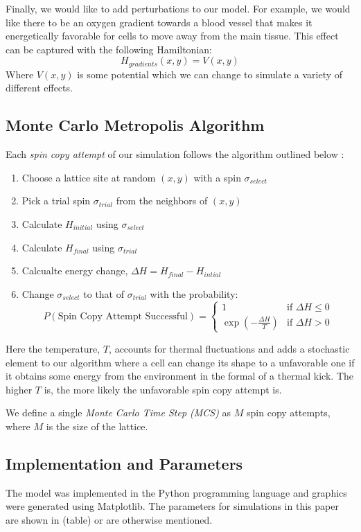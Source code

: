 \documentclass[12pt]{article}
\begin{document}
Finally, we would like to add perturbations to our model. For example, we would like there to be an oxygen gradient towards a blood vessel that makes it energetically favorable for cells to move away from the main tissue. This effect can be captured with the following Hamiltonian:
\begin{equation}
	H_{gradients}(x,y) = V(x,y)
\end{equation}
Where $V(x,y)$ is some potential which we can change to simulate a variety of different effects.

\subsection{Monte Carlo Metropolis Algorithm}
Each \emph{spin copy attempt} of our simulation follows the algorithm outlined below \cite{Glazier2007}:

\begin{enumerate}
  \item Choose a lattice site at random $(x,y)$ with a spin $\sigma_{select}$
  \item Pick a trial spin $\sigma_{trial}$ from the neighbors of $(x,y)$
  \item Calculate $H_{initial}$ using $\sigma_{select}$
  \item Calculate $H_{final}$ using $\sigma_{trial}$
  \item Calcualte energy change, $\Delta H = H_{final} - H_{intial}$
  \item{ Change $\sigma_{select}$ to that of $\sigma_{trial}$ with the probability:
  \[
 P(\text{Spin Copy Attempt Successful}) =
  \begin{cases}
   1 & \text{if } \Delta H \leq 0 \\
   \exp{(-\frac{\Delta H}{T})}       & \text{if } \Delta H > 0
  \end{cases}
\]
}
\end{enumerate}

Here the temperature, $T$, accounts for thermal fluctuations and adds a stochastic element to our algorithm where a cell can change its shape to a unfavorable one if it obtains some energy from the environment in the formal of a thermal kick. The higher $T$ is, the more likely the unfavorable spin copy attempt is.

We define a single \emph{Monte Carlo Time Step (MCS)} as $M$ spin copy attempts, where $M$ is the size of the lattice.

\subsection{Implementation and Parameters}
The model was implemented in the Python programming language and graphics were generated using Matplotlib\cite{matplotlib}. The parameters for simulations in this paper are shown in (table) or are otherwise mentioned. %
\end{document}
